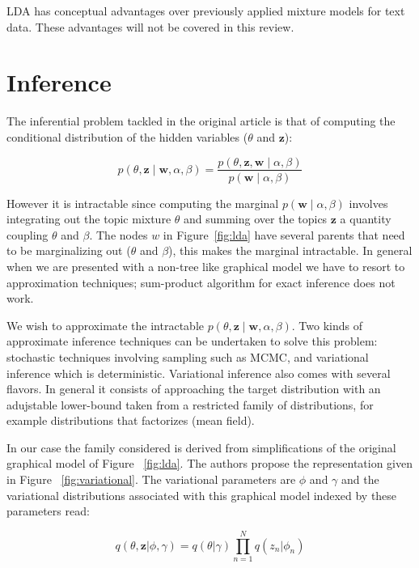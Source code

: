\documentclass[12pt,a4paper,onecolumn]{article}
\begin{document}
LDA has conceptual advantages over previously applied mixture models for text data. These advantages will not be covered in this review.


\section{Inference}
\label{sec:inference}

The inferential problem tackled in the original article is that of computing the conditional distribution of the hidden variables ($\theta$ and $\mathbf{z}$):

$$p(\theta, \mathbf{z} \mid \mathbf{w}, \alpha, \beta) = \frac{p(\theta, \mathbf{z}, \mathbf{w} \mid \alpha, \beta)}{p(\mathbf{w} \mid \alpha, \beta)}$$

However it is intractable since computing the marginal $p(\mathbf{w} \mid \alpha, \beta)$ involves integrating out the topic mixture $\theta$ and summing over the topics $\mathbf{z}$ a quantity coupling $\theta$ and $\beta$. The nodes $w$ in Figure~\ref{fig:lda} have several parents that need to be marginalizing out ($\theta$ and $\beta$), this makes the marginal intractable. In general when we are presented with a non-tree like graphical model we have to resort to approximation techniques; sum-product algorithm for exact inference does not work.

We wish to approximate the intractable $p(\theta, \mathbf{z} \mid \mathbf{w}, \alpha, \beta)$. Two kinds of approximate inference techniques can be undertaken to solve this problem: stochastic techniques involving sampling such as MCMC, and variational inference which is deterministic. Variational inference also comes with several flavors. In general it consists of approaching the target distribution with an adujstable lower-bound taken from a restricted family of distributions, for example distributions that factorizes (mean field).

In our case the family considered is derived from simplifications of the original graphical model of Figure ~\ref{fig:lda}. The authors propose the representation given in Figure ~\ref{fig:variational}. The variational parameters are $\phi$ and $\gamma$ and the variational distributions associated with this graphical model indexed by these parameters read:

\begin{equation*}
	q(\theta, \mathbf{z}|\phi, \gamma) = q(\theta|\gamma)\prod_{n=1}^N q(z_n|\phi_n)
\end{equation*}
\end{document}
